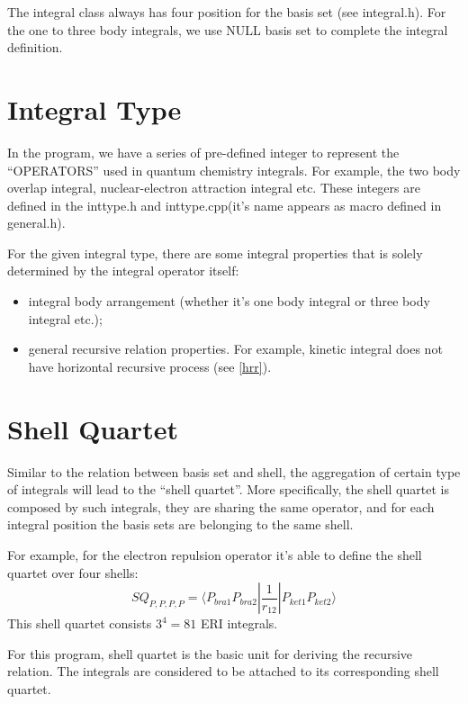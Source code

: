 The integral class always has four position for the basis set (see 
integral.h). For the one to three body integrals, we use NULL
basis set to complete the integral definition.

\section{Integral Type}
%
%
\label{inttype}

In the program, we have a series of pre-defined integer to represent 
the ``OPERATORS'' used in quantum chemistry integrals. For example,
the two body overlap integral, nuclear-electron attraction integral
etc. These integers are defined in the inttype.h and inttype.cpp(it's 
name appears as macro defined in general.h).

For the given integral type, there are some integral properties that 
is solely determined by the integral operator itself:
\begin{itemize}
 \item integral body arrangement (whether it's one body integral or 
 three body integral etc.);
 \item general recursive relation properties. For example, kinetic
	 integral does not have horizontal recursive process (see \ref{hrr}).
\end{itemize}

\section{Shell Quartet}
%
%
\label{shell_quartet}
Similar to the relation between basis set and shell, the aggregation 
of certain type of integrals will lead to the ``shell quartet''.
More specifically, the shell quartet is composed by such integrals,
they are sharing the same operator, and for each integral position
the basis sets are belonging to the same shell.

For example, for the electron repulsion operator it's able to define 
the shell quartet over four shells:
\begin{equation}
 SQ_{P,P,P,P} = \langle P_{bra1}P_{bra2}|
 \frac{1}{r_{12}}|P_{ket1}P_{ket2} \rangle
\end{equation}
This shell quartet consists $3^{4} = 81$ ERI integrals.

For this program, shell quartet is the basic unit for deriving the 
recursive relation. The integrals are considered to be attached to 
its corresponding shell quartet.

